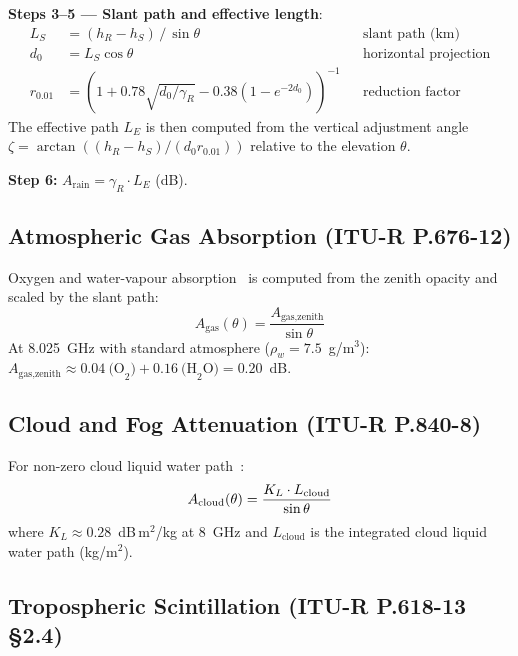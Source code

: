 \documentclass[12pt,a4paper]{report}
\begin{document}
\textbf{Steps 3--5 — Slant path and effective length}:
\begin{align}
    L_S &= (h_R - h_S)\,/\,\sin\theta       && \text{slant path (km)} \\
    d_0 &= L_S \cos\theta                    && \text{horizontal projection} \\
    r_{0.01} &= \left(1 + 0.78\sqrt{d_0/\gamma_R}
               - 0.38(1 - e^{-2d_0})\right)^{-1} && \text{reduction factor}
\end{align}
The effective path $L_E$ is then computed from the vertical adjustment angle
$\zeta = \arctan((h_R - h_S)/(d_0 r_{0.01}))$ relative to the elevation $\theta$.

\textbf{Step 6:} $A_\text{rain} = \gamma_R \cdot L_E$ (dB).

\subsection{Atmospheric Gas Absorption (ITU-R P.676-12)}

Oxygen and water-vapour absorption~\cite{itu_p676} is computed from the zenith
opacity and scaled by the slant path:
\begin{equation}
    A_\text{gas}(\theta) = \frac{A_\text{gas,zenith}}{\sin\theta}
\end{equation}
At 8.025~GHz with standard atmosphere ($\rho_w = 7.5$~g/m$^3$):
$A_\text{gas,zenith} \approx 0.04~\text{(O}_2) + 0.16~\text{(H}_2\text{O)}
= 0.20$~dB.

\subsection{Cloud and Fog Attenuation (ITU-R P.840-8)}

For non-zero cloud liquid water path~\cite{itu_p840}:
\begin{equation}
    A_\text{cloud}(\theta) = \frac{K_L \cdot L_{\rm cloud}}{\sin\theta}
\end{equation}
where $K_L \approx 0.28$~dB\,m$^2$/kg at 8~GHz and $L_\text{cloud}$ is the
integrated cloud liquid water path (kg/m$^2$).

\subsection{Tropospheric Scintillation (ITU-R P.618-13 §2.4)}
\end{document}
